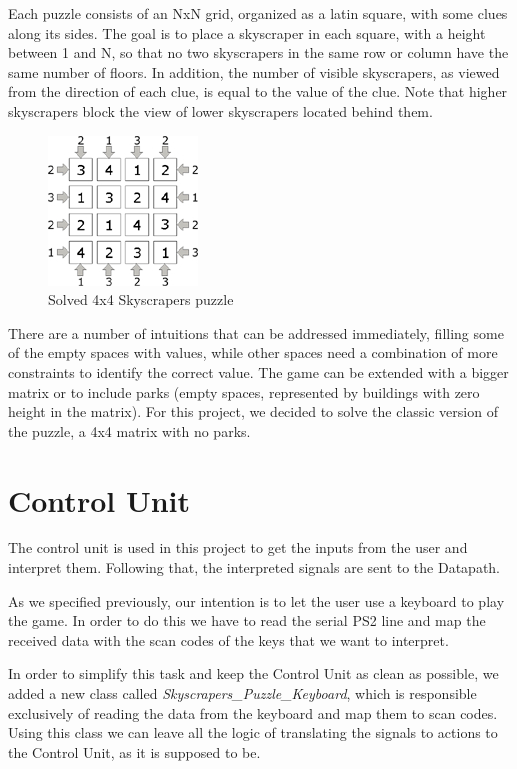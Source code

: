 \documentclass[12pt]{report}
\begin{document}
Each puzzle consists of an NxN grid, organized as a latin square, with some
clues along its sides. The goal is to place a skyscraper in each square,
with a height between 1 and N, so that no two skyscrapers in the same row
or column have the same number of floors. In addition, the number of visible
skyscrapers, as viewed from the direction of each clue, is equal to the value
of the clue. Note that higher skyscrapers block the view of lower skyscrapers
located behind them.

\begin{figure}[H]
  \centering
  \includegraphics[keepaspectratio]{images/skyscrapers_small_solved.jpg}
  \caption{Solved 4x4 Skyscrapers puzzle}
\end{figure}

There are a number of intuitions that can be addressed immediately,
filling some of the empty spaces with values, while other spaces need
a combination of more constraints to identify the correct value. The game
can be extended with a bigger matrix or to include parks (empty spaces,
represented by buildings with zero height in the matrix). For this project, we
decided to solve the classic version of the puzzle, a 4x4 matrix with no parks.

\newpage

\section*{Control Unit}

The control unit is used in this project to get the inputs from the user
and interpret them. Following that, the interpreted signals are sent to
the Datapath.

As we specified previously, our intention is to let the user use
a keyboard to play the game. In order to do this we have to read the
serial PS2 line and map the received data with the scan codes of the
keys that we want to interpret.

In order to simplify this task and keep the Control Unit as clean as possible,
we added a new class called \textit{Skyscrapers\_Puzzle\_Keyboard}, which is
responsible exclusively of reading the data from the keyboard and map them to
scan codes. Using this class we can leave all the logic of translating
the signals to actions to the Control Unit, as it is supposed to be.
\end{document}
